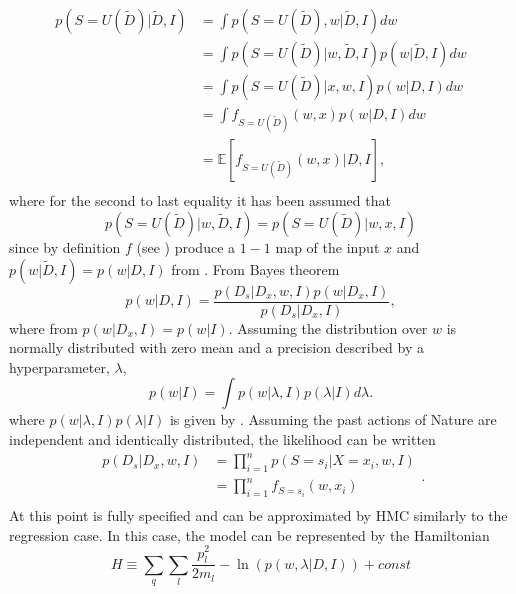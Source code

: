\begin{equation}
	\begin{split}
		p(S= U(\tilde{D})|\tilde{D},I) &= \int p(S = U(\tilde{D}),w|\tilde{D},I) dw \\
		& = \int p(S = U(\tilde{D})|w,\tilde{D},I)  p(w|\tilde{D},I)dw \\
		& = \int p(S = U(\tilde{D})|x,w,I)  p(w|D,I)dw \\
		& = \int f_{S = U(\tilde{D})}(w,x)  p(w|D,I)dw \\
		& = \mathbb{E}[f_{S = U(\tilde{D})}(w,x)|D,I],\\
	\end{split}
	\label{eq:q5}
\end{equation}
where for the second to last equality it has been assumed that
\begin{equation}
	p(S = U(\tilde{D})|w,\tilde{D},I) = p(S = U(\tilde{D})|w,x,I)
\end{equation}
since by definition $f$ (see ) produce a $1-1$ map of the input $x$ and $p(w|\tilde{D},I) = p(w|D,I)$ from . From Bayes theorem
\begin{equation}
	p(w|D,I) =\frac{p(D_s|D_x,w,I)p(w|D_x,I)}{p(D_s|D_x,I)},
\end{equation}
where from  $p(w|D_x,I) = p(w|I)$. Assuming the distribution over $w$ is normally distributed with zero mean and a precision described by a hyperparameter, $\lambda$, 
\begin{equation}
	p(w|I) = \int p(w|\lambda,I)p(\lambda|I)d\lambda.
\end{equation}
where $p(w|\lambda,I)p(\lambda|I)$ is given by . Assuming the past actions of Nature are independent and identically distributed, the likelihood can be written~\citep{Fischer1999} 
\begin{equation}
	\begin{split}
		p(D_s|D_x,w,I) &=\prod_{i=1}^{n}p(S = s_i|X = x_i,w,I)\\
		&=\prod_{i=1}^{n}f_{S = s_i}(w,x_i)\\
	\end{split}.
	\label{lik}
\end{equation}
At this point  is fully specified and can be approximated by HMC similarly to the regression case. In this case, the model can be represented by the Hamiltonian 
\begin{equation}
	H \equiv  \sum_{q}\sum_{l}\frac{p_{l}^2}{2m_{l}}-\ln(p(w,\lambda|D,I))+const
	\label{ham3}
\end{equation}
